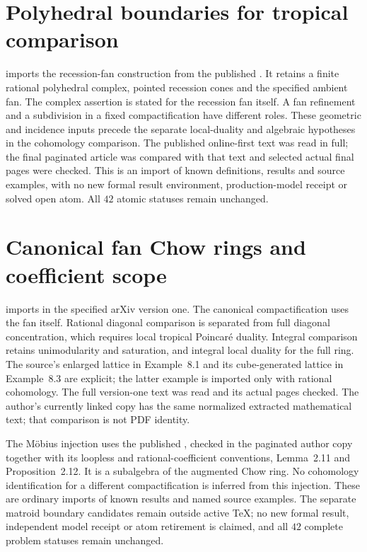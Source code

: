 \section{Polyhedral boundaries for tropical comparison}
\label{sec:provenance-tropical-compactification}

 imports the recession-fan
construction from the published \cite[Definitions~2.1, 2.2, 3.1 and~3.8,
Lemma~3.31, Theorem~3.32, Propositions~3.24 and~3.25, Examples~3.27
and~6.1, Theorem~4.8 and \S5]{KSW25Compactification}. It retains a
finite rational polyhedral complex, pointed recession cones and the
specified ambient fan. The complex assertion is stated for the
recession fan itself. A fan refinement and a subdivision in a fixed
compactification have different roles. These geometric and incidence
inputs precede the separate local-duality and algebraic hypotheses
in the cohomology comparison. The published online-first text was read
in full; the final paginated article was compared with that text and
selected actual final pages were checked. This is an import of known
definitions, results and source examples, with no new formal result
environment, production-model receipt or solved open atom. All $42$
atomic statuses remain unchanged.

\section{Canonical fan Chow rings and coefficient scope}
\label{sec:provenance-canonical-fan-chow}

 imports
\cite[Theorems~1.1--1.3, \S2.1, Examples~8.1 and~8.3]{AP24FanChow}
in the specified arXiv version one. The canonical compactification uses
the fan itself. Rational diagonal comparison is separated from full
diagonal concentration, which requires local tropical Poincar\'e
duality. Integral comparison retains unimodularity and saturation,
and integral local duality for the full ring. The source's enlarged
lattice in Example~8.1 and its cube-generated lattice in Example~8.3
are explicit; the latter example is imported only with rational
cohomology. The full version-one text was read and its actual pages
checked. The author's currently linked copy has the same normalized
extracted mathematical text; that comparison is not PDF identity.

The M\"obius injection uses the published
\cite[Proposition~2.18]{BHM22AugmentedChow}, checked in the paginated
author copy together with its loopless and rational-coefficient
conventions, Lemma~2.11 and Proposition~2.12. It is a subalgebra of
the augmented Chow ring. No cohomology identification for a different
compactification is inferred from this injection. These are ordinary
imports of known results and named source examples. The separate
matroid boundary candidates remain outside active \TeX; no new
formal result, independent model receipt or atom retirement is
claimed, and all $42$ complete problem statuses remain unchanged.


